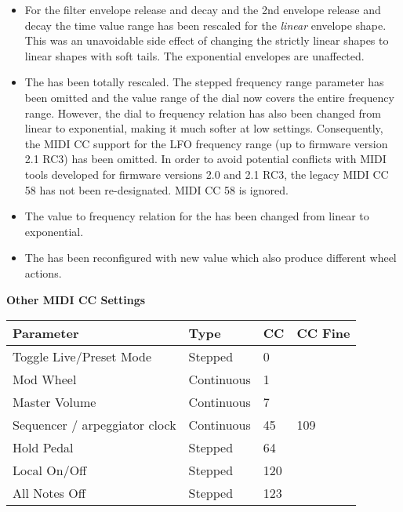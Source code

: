 \begin{itemize}
  \item For the filter envelope release and decay and the 2nd envelope release and decay the time value range has been rescaled for the \textit{linear} envelope shape. This was an unavoidable side effect of changing the strictly linear shapes to linear shapes with soft tails. The exponential envelopes are unaffected.
  \item The \lfofreq has been totally rescaled. The stepped frequency range parameter has been omitted and the value range of the \lfofreq dial now covers the entire frequency range. However, the dial to frequency relation has also been changed from linear to exponential, making it much softer at low settings. Consequently, the MIDI CC support for the LFO frequency range (up to firmware version 2.1 RC3) has been omitted. In order to avoid potential conflicts with MIDI tools developed for firmware versions 2.0 and 2.1 RC3, the legacy MIDI CC 58 has not been re-designated. MIDI CC 58 is ignored.
  \item The value to frequency relation for the \vibspeed has been changed from linear to exponential.   
  \item The \modwheelrange has been reconfigured with new value which also produce different wheel actions.
\end{itemize}

\textbf{Other MIDI CC Settings}

\begin{longtable}[l]{ p{6cm}|p{2.5cm}|p{1.5cm}|p{2cm}} 
\textbf{Parameter} & \textbf{Type} & \textbf{CC} & \textbf{CC Fine} \\ \hline
Toggle Live/Preset Mode & Stepped & 0 & \\ \hline
Mod Wheel & Continuous & 1 & \\ \hline
Master Volume & Continuous & 7 & \\ \hline
Sequencer / arpeggiator clock & Continuous & 45 & 109 \\ \hline
Hold Pedal & Stepped & 64 & \\ \hline
Local On/Off & Stepped & 120 & \\ \hline
All Notes Off & Stepped & 123 & \\ \hline
\end{longtable}



\normalsize
